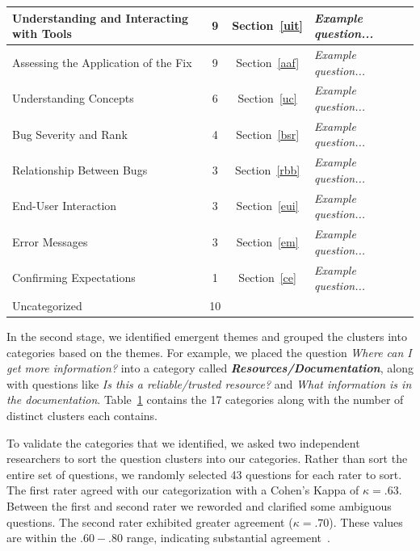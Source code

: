 \documentclass[conference]{IEEEtran}
\begin{document}
\begin{table}
\begin{tabular}{|l|c|c|l|}
    Understanding and Interacting with Tools			& 9     	& Section~\ref{uit}				& \emph{Example question...}			\\
    \hline
    Assessing the Application of the Fix				& 9     	& Section~\ref{aaf}				& \emph{Example question...}			\\
    \hline
    Understanding Concepts								& 6 		& Section~\ref{uc}				& \emph{Example question...}				\\
    \hline
    Bug Severity and Rank								& 4     	& Section~\ref{bsr}				& \emph{Example question...}			\\
    \hline
    Relationship Between Bugs							& 3     	& Section~\ref{rbb}				& \emph{Example question...}			\\
    \hline
    End-User Interaction								& 3     	& Section~\ref{eui}				& \emph{Example question...}		\\
    \hline
    Error Messages										& 3     	& Section~\ref{em}				& \emph{Example question...}			\\
    \hline
    Confirming Expectations					 			& 1			& Section~\ref{ce}				& \emph{Example question...}   \\
    \hline
    Uncategorized										& 10    	&						& \emph{} \\
    \hline
\end{tabular}
\label{table:categories}
\end{table}


In the second stage, we identified emergent themes and grouped the clusters into categories based on the themes. 
For example, we placed the question \textit{Where can I get more information?} into a category called \emph{\textbf{Resources/Documentation}}, along with questions like \textit{Is this a reliable/trusted resource?} and \textit{What information is in the documentation}. 
Table~\ref{table:categories} contains the 17 categories along with the number of distinct clusters each contains. 

To validate the categories that we identified, we asked two independent researchers to sort the question clusters into our categories. 
Rather than sort the entire set of questions, we randomly selected 43 questions for each rater to sort.
The first rater agreed with our categorization with a Cohen's Kappa of $\kappa = .63$. 
Between the first and second rater we reworded and clarified some ambiguous questions. The second rater exhibited greater agreement ($\kappa = .70$). 
These values are within the $.60 - .80$ range, indicating substantial agreement~\cite{Landis1977agreement}.
\end{document}
